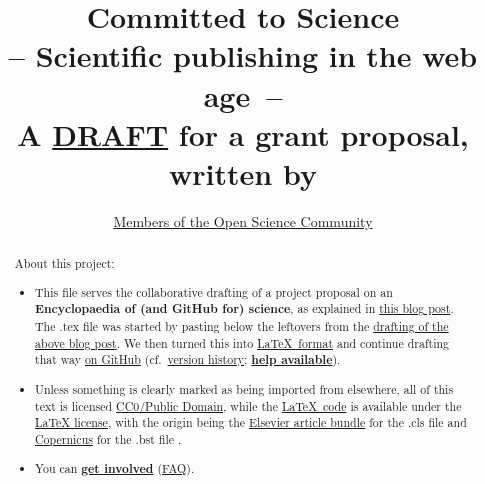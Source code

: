 \documentclass[final,authoryear,3p]{elsarticle-open-drafting}
\begin{document}
\begin{frontmatter}
	\title{{\LARGE \bf Committed to Science}\\-- Scientific publishing in the web age~--\\ A  \href{http://en.wikiversity.org/wiki/User:OpenScientist/Open_grant_writing_-_Encyclopaedia_of_original_research}{DRAFT} for a grant proposal,\\ written by}
	\author{\href{https://github.com/Daniel-Mietchen/Open-Research-Proposals/graphs/impact}{Members of the Open Science Community}}
	\begin{abstract}
		About this project:
		\begin{itemize}
			\item This file serves the collaborative drafting of a project proposal on an\\ 
			{\bf Encyclopaedia of (and GitHub for) science}, 
			as explained in \href{http://www.science3point0.com/evomri/2011/05/03/drafting-proposals-in-the-open-sketching-out-project-ideas/}{this blog post}. The .tex file was started by pasting below the leftovers from the \href{http://species-id.net/w/index.php?title=Draft:Encyclopaedia_of_original_research&oldid=5524}{drafting of the above blog post}. We then turned this into \href{http://en.wikibooks.org/wiki/LaTeX}{ \LaTeX~format} and continue drafting that way \href{https://github.com/Daniel-Mietchen/Open-Research-Proposals/commits/master}{on GitHub} (cf.\ \href{https://github.com/Daniel-Mietchen/Open-Research-Proposals/commits/master}{version history}; {\bf \href{http://help.github.com/}{help available}}).
			\item Unless something is clearly marked as being imported from elsewhere, all of this text is licensed 
			\href{http://creativecommons.org/publicdomain/zero/1.0/}{CC0/Public Domain}, 
			while the \href{https://github.com/Daniel-Mietchen/Open-Research-Proposals/blob/master/open-drafting.tex}{\LaTeX~code} 
			is available under the \href{http://www.latex-project.org/lppl.txt }{LaTeX license}, with the origin being the \href{http://www.elsevier.com/wps/find/authorsview.authors/elsarticle}{Elsevier article bundle} for the .cls file and \href{http://www.earth-system-science-data.net/Copernicus.bst}{Copernicus} for the .bst file . 
			
			\item You can {\bf \href{http://en.wikiversity.org/wiki/User:OpenScientist/Open_grant_writing_-_Encyclopaedia_of_original_research}{get involved}} (\href{http://www.science3point0.com/coaspedia/index.php/COASPedia:FAQ}{FAQ}). 
			

\end{itemize}
\end{abstract}
\end{frontmatter}
\end{document}
